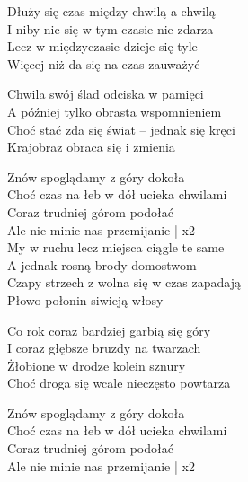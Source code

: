 \begin{text}
Dłuży się czas między chwilą a chwilą\\
I niby nic się w tym czasie nie zdarza\\
Lecz w międzyczasie dzieje się tyle\\
Więcej niż da się na czas zauważyć

Chwila swój ślad odciska w pamięci\\
A później tylko obrasta wspomnieniem\\
Choć stać zda się świat – jednak się kręci\\
Krajobraz obraca się i zmienia

Znów spoglądamy z góry dokoła\\
Choć czas na łeb w dół ucieka chwilami\\
Coraz trudniej górom podołać\\
Ale nie minie nas przemijanie | x2\\

My w ruchu lecz miejsca ciągle te same\\
A jednak rosną brody domostwom\\
Czapy strzech z wolna się w czas zapadają\\
Płowo połonin siwieją włosy

Co rok coraz bardziej garbią się góry\\
I coraz głębsze bruzdy na twarzach\\
Żłobione w drodze kolein sznury\\
Choć droga się wcale nieczęsto powtarza

Znów spoglądamy z góry dokoła\\
Choć czas na łeb w dół ucieka chwilami\\
Coraz trudniej górom podołać\\
Ale nie minie nas przemijanie | x2
\end{text}